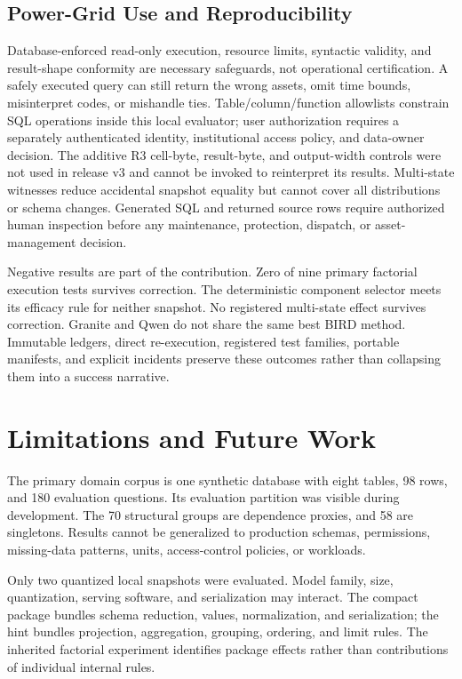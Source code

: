 \documentclass[applsci,article,submit,moreauthors]{Definitions/mdpi}
\begin{document}
\subsection{Power-Grid Use and Reproducibility}

Database-enforced read-only execution, resource limits, syntactic validity, and result-shape conformity are necessary safeguards, not operational certification. A safely executed query can still return the wrong assets, omit time bounds, misinterpret codes, or mishandle ties. Table/column/function allowlists constrain SQL operations inside this local evaluator; user authorization requires a separately authenticated identity, institutional access policy, and data-owner decision. The additive R3 cell-byte, result-byte, and output-width controls were not used in release v3 and cannot be invoked to reinterpret its results. Multi-state witnesses reduce accidental snapshot equality but cannot cover all distributions or schema changes. Generated SQL and returned source rows require authorized human inspection before any maintenance, protection, dispatch, or asset-management decision.

Negative results are part of the contribution. Zero of nine primary factorial execution tests survives correction. The deterministic component selector meets its efficacy rule for neither snapshot. No registered multi-state effect survives correction. Granite and Qwen do not share the same best BIRD method. Immutable ledgers, direct re-execution, registered test families, portable manifests, and explicit incidents preserve these outcomes rather than collapsing them into a success narrative.

\section{Limitations and Future Work}

The primary domain corpus is one synthetic database with eight tables, 98 rows, and 180 evaluation questions. Its evaluation partition was visible during development. The 70 structural groups are dependence proxies, and 58 are singletons. Results cannot be generalized to production schemas, permissions, missing-data patterns, units, access-control policies, or workloads.

Only two quantized local snapshots were evaluated. Model family, size, quantization, serving software, and serialization may interact. The compact package bundles schema reduction, values, normalization, and serialization; the hint bundles projection, aggregation, grouping, ordering, and limit rules. The inherited factorial experiment identifies package effects rather than contributions of individual internal rules.
\end{document}
